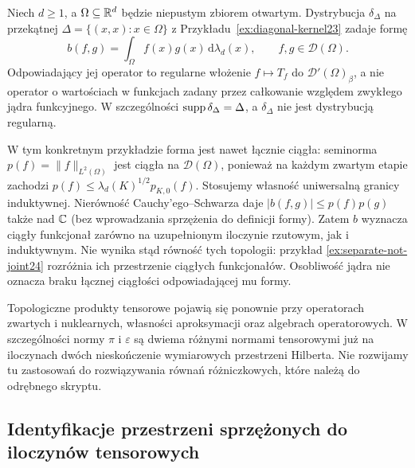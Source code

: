 \begin{przyklad}
\label{ex:diag-tensor24}
Niech $d\ge1$, a $\Omega\subseteq\mathbb R^d$ będzie
niepustym zbiorem otwartym. Dystrybucja
$\delta_\Delta$ na przekątnej $\Delta=\{(x,x):x\in\Omega\}$
z Przykładu~\ref{ex:diagonal-kernel23} zadaje formę
\[
 b(f,g)=\int_\Omega f(x)g(x)\,\mathrm d\lambda_d(x),
 \qquad f,g\in\mathcal D(\Omega).
\]
Odpowiadający jej operator to regularne włożenie
$f\mapsto T_f$ do $\mathcal D'(\Omega)_\beta$,
a nie operator o wartościach w funkcjach zadany
przez całkowanie względem zwykłego jądra funkcyjnego.
W szczególności $\operatorname{supp}\delta_\Delta=\Delta$,
a $\delta_\Delta$ nie jest dystrybucją regularną.

W tym konkretnym przykładzie forma jest nawet
łącznie ciągła: seminorma
$p(f)=\|f\|_{L^2(\Omega)}$ jest ciągła na
$\mathcal D(\Omega)$, ponieważ na każdym zwartym
etapie zachodzi
$p(f)\le\lambda_d(K)^{1/2}p_{K,0}(f)$.
Stosujemy własność uniwersalną granicy induktywnej.
Nierówność Cauchy'ego--Schwarza daje
$|b(f,g)|\le p(f)p(g)$ także nad $\mathbb C$
(bez wprowadzania sprzężenia do definicji formy).
Zatem $b$ wyznacza ciągły funkcjonał zarówno na
uzupełnionym iloczynie rzutowym, jak i induktywnym.
Nie wynika stąd równość tych topologii: przykład
\ref{ex:separate-not-joint24} rozróżnia ich
przestrzenie ciągłych funkcjonałów.
Osobliwość jądra nie oznacza braku łącznej
ciągłości odpowiadającej mu formy.
\end{przyklad}

\begin{uwaga}
\label{rem:tensor-next24}
Topologiczne produkty tensorowe pojawią się ponownie
przy operatorach zwartych i nuklearnych, własności
aproksymacji oraz algebrach operatorowych.
W szczególności normy $\pi$ i $\varepsilon$ są dwiema
różnymi normami tensorowymi już na iloczynach dwóch
nieskończenie wymiarowych przestrzeni Hilberta.
Nie rozwijamy tu zastosowań do rozwiązywania równań
różniczkowych, które należą do odrębnego skryptu.
\end{uwaga}

\subsection{Identyfikacje przestrzeni sprzężonych do iloczynów tensorowych}


